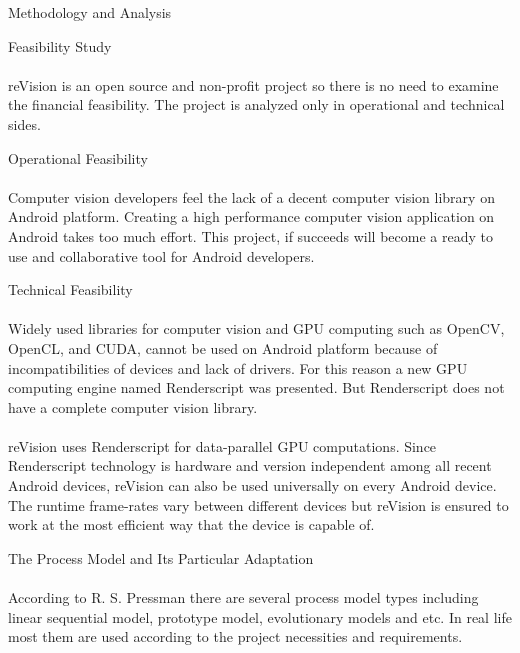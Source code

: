 \documentclass[12pt, a4paper]{article} \pagenumbering{gobble}
\begin{document}
\begin{section}{Methodology and Analysis}
  \begin{subsection}{Feasibility Study}
    \paragraph{}{reVision is an open source and non-profit project so there is no need to examine the financial feasibility. The project is analyzed only in operational and technical sides.}
    \begin{subsubsection}{Operational Feasibility}
      \paragraph{}{Computer vision developers feel the lack of a decent computer vision library on Android platform. Creating a high performance computer vision application on Android takes too much effort. This project, if succeeds will become a ready to use and collaborative tool for Android developers.}
    \end{subsubsection}

    \begin{subsubsection}{Technical Feasibility}
      \paragraph{}{Widely used libraries for computer vision and GPU computing such as OpenCV, OpenCL, and CUDA, cannot be used on Android platform because of incompatibilities of devices and lack of drivers. For this reason a new GPU computing engine named Renderscript was presented. But Renderscript does not have a complete computer vision library.}
      \paragraph{}{reVision uses Renderscript for data-parallel GPU computations. Since Renderscript technology is hardware and version independent among all recent Android devices, reVision can also be used universally on every Android device. The runtime frame-rates vary between different devices but reVision is ensured to work at the most efficient way that the device is capable of.}
    \end{subsubsection}
  \end{subsection}
  \newpage
  \begin{subsection}{The Process Model and Its Particular Adaptation}
    \paragraph{}{According to R. S. Pressman there are several process model types including linear sequential model, prototype model, evolutionary models and etc. In real life most them are used according to the project necessities and requirements.}

\end{subsection}
\end{section}
\end{document}
